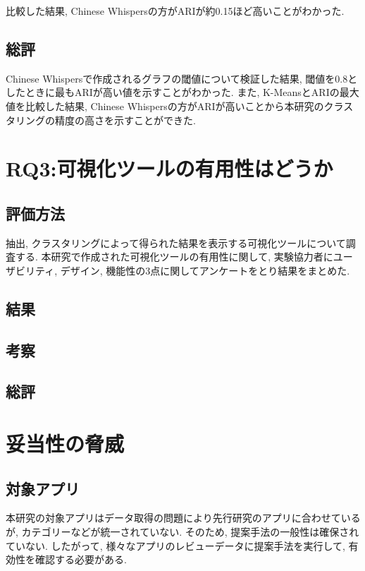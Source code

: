 比較した結果, Chinese Whispersの方がARIが約0.15ほど高いことがわかった. 

\subsection{総評}
Chinese Whispersで作成されるグラフの閾値について検証した結果, 閾値を0.8としたときに最もARIが高い値を示すことがわかった. 
また, K-MeansとARIの最大値を比較した結果, Chinese Whispersの方がARIが高いことから本研究のクラスタリングの精度の高さを示すことができた. 



\section{RQ3:可視化ツールの有用性はどうか}
\subsection{評価方法}
抽出, クラスタリングによって得られた結果を表示する可視化ツールについて調査する. 本研究で作成された可視化ツールの有用性に関して, 実験協力者にユーザビリティ, デザイン, 機能性の3点に関してアンケートをとり結果をまとめた. 

\subsection{結果}

\subsection{考察}

\subsection{総評}

\section{妥当性の脅威}
\subsection{対象アプリ}
本研究の対象アプリはデータ取得の問題により先行研究のアプリに合わせているが, カテゴリーなどが統一されていない. そのため, 提案手法の一般性は確保されていない. 
したがって, 様々なアプリのレビューデータに提案手法を実行して, 有効性を確認する必要がある. 

